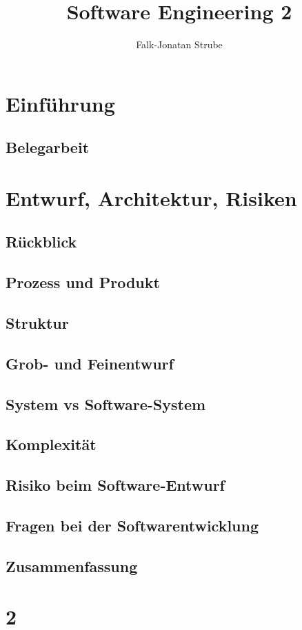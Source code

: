 \documentclass{scrreprt}
\title{Software Engineering 2}
\author{Falk-Jonatan Strube}
\begin{document}
\maketitle
\tableofcontents

\chapter*{Einführung}
\section*{Belegarbeit}
\chapter{Entwurf, Architektur, Risiken}
\section{Rückblick}
\section{Prozess und Produkt}
\section{Struktur}
\section{Grob- und Feinentwurf}
\section{System vs Software-System}
\section{Komplexität}
\section{Risiko beim Software-Entwurf}
\section{Fragen bei der Softwarentwicklung}
\section{Zusammenfassung}

\chapter{2}
\end{document}
